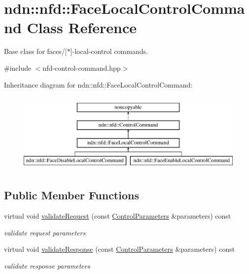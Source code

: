 \hypertarget{classndn_1_1nfd_1_1FaceLocalControlCommand}{}\section{ndn\+:\+:nfd\+:\+:Face\+Local\+Control\+Command Class Reference}
\label{classndn_1_1nfd_1_1FaceLocalControlCommand}


Base class for faces/\mbox{[}$\ast$\mbox{]}-\/local-\/control commands.  




{\ttfamily \#include $<$nfd-\/control-\/command.\+hpp$>$}

Inheritance diagram for ndn\+:\+:nfd\+:\+:Face\+Local\+Control\+Command\+:\begin{figure}[H]
\begin{center}
\leavevmode
\includegraphics[height=4.000000cm]{classndn_1_1nfd_1_1FaceLocalControlCommand}
\end{center}
\end{figure}
\subsection*{Public Member Functions}
\begin{DoxyCompactItemize}
\item 
virtual void \hyperlink{classndn_1_1nfd_1_1FaceLocalControlCommand_aab9e0ea4747e94f2a15121f9533e8d25}{validate\+Request} (const \hyperlink{classndn_1_1nfd_1_1ControlParameters}{Control\+Parameters} \&parameters) const
\begin{DoxyCompactList}\small\item\em validate request parameters \end{DoxyCompactList}\item 
virtual void \hyperlink{classndn_1_1nfd_1_1FaceLocalControlCommand_a29f7eaef6c002089a83e46880577518c}{validate\+Response} (const \hyperlink{classndn_1_1nfd_1_1ControlParameters}{Control\+Parameters} \&parameters) const
\begin{DoxyCompactList}\small\item\em validate response parameters \end{DoxyCompactList}\end{DoxyCompactItemize}

